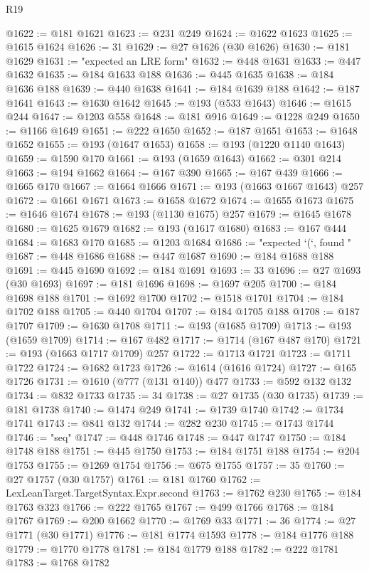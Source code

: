 \begin{lexlean}{R19}
\begin{coremodule}
@1622 := @181 @1621
@1623 := @231 @249
@1624 := @1622 @1623
@1625 := @1615 @1624
@1626 := 31
@1629 := @27 @1626 (@30 @1626)
@1630 := @181 @1629
@1631 := "expected an LRE form"
@1632 := @448 @1631
@1633 := @447 @1632
@1635 := @184 @1633 @188
@1636 := @445 @1635
@1638 := @184 @1636 @188
@1639 := @440 @1638
@1641 := @184 @1639 @188
@1642 := @187 @1641
@1643 := @1630 @1642
@1645 := @193 (@533 @1643)
@1646 := @1615 @244
@1647 := @1203 @558
@1648 := @181 @916
@1649 := @1228 @249
@1650 := @1166 @1649
@1651 := @222 @1650
@1652 := @187 @1651
@1653 := @1648 @1652
@1655 := @193 (@1647 @1653)
@1658 := @193 (@1220 @1140 @1643)
@1659 := @1590 @170
@1661 := @193 (@1659 @1643)
@1662 := @301 @214
@1663 := @194 @1662
@1664 := @167 @390
@1665 := @167 @439
@1666 := @1665 @170
@1667 := @1664 @1666
@1671 := @193 (@1663 @1667 @1643) @257
@1672 := @1661 @1671
@1673 := @1658 @1672
@1674 := @1655 @1673
@1675 := @1646 @1674
@1678 := @193 (@1130 @1675) @257
@1679 := @1645 @1678
@1680 := @1625 @1679
@1682 := @193 (@1617 @1680)
@1683 := @167 @444
@1684 := @1683 @170
@1685 := @1203 @1684
@1686 := "expected `(`, found "
@1687 := @448 @1686
@1688 := @447 @1687
@1690 := @184 @1688 @188
@1691 := @445 @1690
@1692 := @184 @1691
@1693 := 33
@1696 := @27 @1693 (@30 @1693)
@1697 := @181 @1696
@1698 := @1697 @205
@1700 := @184 @1698 @188
@1701 := @1692 @1700
@1702 := @1518 @1701
@1704 := @184 @1702 @188
@1705 := @440 @1704
@1707 := @184 @1705 @188
@1708 := @187 @1707
@1709 := @1630 @1708
@1711 := @193 (@1685 @1709)
@1713 := @193 (@1659 @1709)
@1714 := @167 @482
@1717 := @1714 (@167 @487 @170)
@1721 := @193 (@1663 @1717 @1709) @257
@1722 := @1713 @1721
@1723 := @1711 @1722
@1724 := @1682 @1723
@1726 := @1614 (@1616 @1724)
@1727 := @165 @1726
@1731 := @1610 (@777 (@131 @140)) @477
@1733 := @592 @132 @132
@1734 := @832 @1733
@1735 := 34
@1738 := @27 @1735 (@30 @1735)
@1739 := @181 @1738
@1740 := @1474 @249
@1741 := @1739 @1740
@1742 := @1734 @1741
@1743 := @841 @132
@1744 := @282 @230
@1745 := @1743 @1744
@1746 := "seq"
@1747 := @448 @1746
@1748 := @447 @1747
@1750 := @184 @1748 @188
@1751 := @445 @1750
@1753 := @184 @1751 @188
@1754 := @204 @1753
@1755 := @1269 @1754
@1756 := @675 @1755
@1757 := 35
@1760 := @27 @1757 (@30 @1757)
@1761 := @181 @1760
@1762 := LexLeanTarget.TargetSyntax.Expr.second
@1763 := @1762 @230
@1765 := @184 @1763 @323
@1766 := @222 @1765
@1767 := @499 @1766
@1768 := @184 @1767
@1769 := @200 @1662
@1770 := @1769 @33
@1771 := 36
@1774 := @27 @1771 (@30 @1771)
@1776 := @181 @1774 @1593
@1778 := @184 @1776 @188
@1779 := @1770 @1778
@1781 := @184 @1779 @188
@1782 := @222 @1781
@1783 := @1768 @1782

\end{coremodule}
\end{lexlean}
